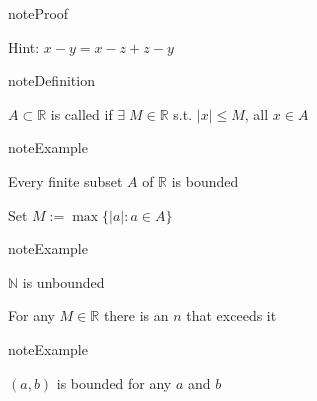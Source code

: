 \documentclass[letterpaper,10pt,english]{jupyterBook}
\begin{document}
\begin{sphinxadmonition}{note}{Proof}

\sphinxAtStartPar
Hint: \(x-y = x-z+z-y\)
\end{sphinxadmonition}

\begin{sphinxadmonition}{note}{Definition}

\sphinxAtStartPar
\(A \subset \mathbb{R}\) is called  if
\(\exists \; M \in \mathbb{R}\) s.t. \(|x| \leq M\), all \(x \in A\)
\end{sphinxadmonition}

\begin{figure}[htbp]
\centering

\noindent{}
\end{figure}

\begin{sphinxadmonition}{note}{Example}

\sphinxAtStartPar
Every finite subset \(A\) of \(\mathbb{R}\) is bounded
\end{sphinxadmonition}

\sphinxAtStartPar
Set \(M := \max \{  |a| : a \in A \}\)

\begin{sphinxadmonition}{note}{Example}

\sphinxAtStartPar
\(\mathbb{N}\) is unbounded
\end{sphinxadmonition}

\sphinxAtStartPar
For any \(M \in \mathbb{R}\) there is an \(n\) that exceeds it

\begin{sphinxadmonition}{note}{Example}

\sphinxAtStartPar
\((a, b)\) is bounded for any \(a\) and \(b\)
\end{sphinxadmonition}
\end{document}
